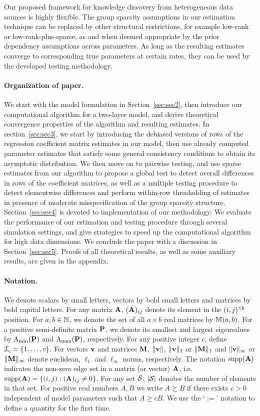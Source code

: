 Our proposed framework for knowledge discovery from heterogeneous data sources is highly flexible. The group sparsity assumptions in our estimation technique can be replaced by other structural restrictions, for example low-rank or low-rank-plus-sparse, as and when deemed appropriate by the prior dependency assumptions across parameters. As long as the resulting estimates converge to corresponding true parameters at certain rates, they can be used by the developed testing methodology.

\paragraph{Organization of paper.}
We start with the model formulation in Section~\ref{sec:sec2}, then introduce our computational algorithm for a two-layer model, and derive theoretical convergence properties of the algorithm and resulting estimates. In section~\ref{sec:sec3}, we start by introducing the debiased versions of rows of the regression coefficient matrix estimates in our model, then use already computed parameter estimates that satisfy some general consistency conditions to obtain its asymptotic distribution. We then move on to pairwise testing, and use sparse estimates from our algorithm to propose a global test to detect overall differences in rows of the coefficient matrices, as well as a multiple testing procedure to detect elementwise differences and perform within-row thresholding of estimates in presence of moderate misspecification of the group sparsity structure. Section~\ref{sec:sec4} is devoted to implementation of our methodology. We evaluate the performance of our estimation and testing procedure through several simulation settings, and give strategies to speed up the computational algorithm for high data dimensions.  We conclude the paper with a discussion in Section~\ref{sec:sec5}. Proofs of all theoretical results, as well as some auxiliary results, are given in the appendix.

\paragraph{Notation.}
We denote scalars by small letters, vectors by bold small letters and matrices by bold capital letters. For any matrix ${\mathbf{A}}$, $({\mathbf{A}})_{ij}$ denote its element in the $(i,j)\operatorname*{^{\text{th}}}$ position. For $a,b \in {\mathbb{N}}$, we denote the set of all $a \times b$ real matrices by ${\mathbb{M}}(a,b)$. For a positive semi-definite matrix ${\mathbf{P}}$, we denote its smallest and largest eigenvalues by $\Lambda_{\min} ({\mathbf{P}})$ and $\Lambda_{\max} ({\mathbf{P}})$, respectively. For any positive integer $c$, define ${\cal{I}}_c = \{ 1, \ldots, c\}$. For vectors ${\bf{v}}$ and matrices ${\mathbf{M}}$, $\| {\bf{v}} \|$, $\|{\bf{v}} \|_1$ or $\|{\mathbf{M}} \|_1$ and $\|{\bf{v}} \|_\infty$ or $\|{\mathbf{M}} \|_\infty$ denote euclidean, $\ell_1$ and $\ell_\infty$ norms, respectively. The notation $\operatorname*{supp}({\mathbf{A}})$ indicates the non-zero edge set in a matrix (or vector) ${\mathbf{A}}$, i.e. $\operatorname*{supp}({\mathbf{A}}) = \{(i,j): ({\mathbf{A}})_{ij} \neq 0\}$. For any set ${\cal{S}}$, $| {\cal{S}}|$ denotes the number of elements in that set. For positive real numbers $A, B$ we write $A \succsim B$ if there exists $c>0$ independent of model parameters such that $A \geq cB$. We use the `$:=$' notation to define a quantity for the first time.